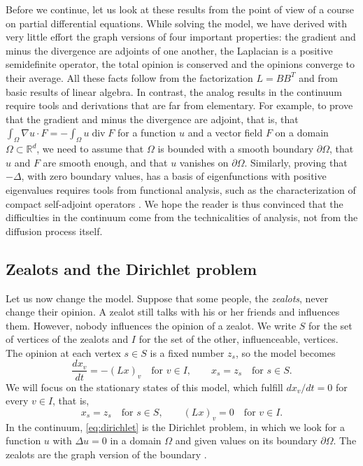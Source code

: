 \documentclass[11pt,a4paper]{article}
\theoremstyle{plain}
\theoremstyle{definition}
\newcommand{\R}{\mathbb{R}}
\begin{document}
Before we continue, let us look at these results from the point of view of a course on partial differential equations. While solving the model, we have derived with very little effort the graph versions of four important properties: the gradient and minus the divergence are adjoints of one another, the Laplacian is a positive semidefinite operator, the total opinion is conserved and the opinions converge to their average. All these facts follow from the factorization $L=BB^T$ and from basic results of linear algebra. In contrast, the analog results in the continuum require tools and derivations that are far from elementary. For example, to prove that the gradient and minus the divergence are adjoint, that is, that $\int_\Omega\nabla u\cdot F=-\int_\Omega u\operatorname{div}F$ for a function $u$ and a vector field $F$ on a domain $\Omega\subset\R^d$, we need to assume that $\Omega$ is bounded with a smooth boundary $\partial\Omega$, that $u$ and $F$ are smooth enough, and that $u$ vanishes on $\partial\Omega$. Similarly, proving that $-\Delta$, with zero boundary values, has a basis of eigenfunctions with positive eigenvalues requires tools from functional analysis, such as the characterization of compact self-adjoint operators \cite{evans2010}. We hope the reader is thus convinced that the difficulties in the continuum come from the technicalities of analysis, not from the diffusion process itself.

\subsection{Zealots and the Dirichlet problem}

Let us now change the model. Suppose that some people, the \textit{zealots}, never change their opinion. A zealot still talks with his or her friends and influences them. However, nobody influences the opinion of a zealot. We write $S$ for the set of vertices of the zealots and $I$ for the set of the other, influenceable, vertices. The opinion at each vertex $s\in S$ is a fixed number $z_s$, so the model becomes
\[
\frac{dx_v}{dt}=-(Lx)_v\quad\text{for } v\in I,\qquad x_s=z_s\quad\text{for } s\in S .
\]
We will focus on the stationary states of this model, which fulfill $dx_v/dt=0$ for every $v\in I$, that is,
\begin{equation}\label{eq:dirichlet}
x_s=z_s\quad\text{for } s\in S,\qquad (Lx)_v=0\quad\text{for } v\in I .
\end{equation}
In the continuum, \eqref{eq:dirichlet} is the Dirichlet problem, in which we look for a function $u$ with $\Delta u=0$ in a domain $\Omega$ and given values on its boundary $\partial\Omega$. The zealots are the graph version of the boundary \cite{doyle1984}.
\end{document}
